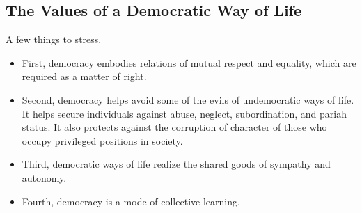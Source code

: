 \documentclass[letterpaper]{article}
\begin{document}
\subsection{The Values of a Democratic Way of Life}
A few things to stress. 
\begin{itemize}
    \item First, democracy embodies relations of mutual respect and equality, which are required as a matter of right.
    \item Second, democracy helps avoid some of the evils of undemocratic ways of life. It helps secure individuals against abuse, neglect, subordination, and pariah status. It also protects against the corruption of character of those who occupy privileged positions in society. 
    \item Third, democratic ways of life realize the shared goods of sympathy and autonomy.
    \item Fourth, democracy is a mode of collective learning.
\end{itemize}
\end{document}
